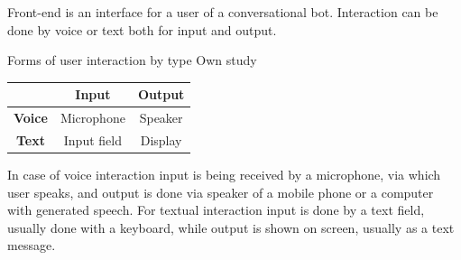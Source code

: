 Front-end is an interface for a user of a conversational bot.
Interaction can be done by voice or text both for input and output.

\mttable
{Forms of user interaction by type}
{Own study}
{
    \begin{tabular}{|c|c|c|}
        \hline
        & \textbf{Input} & \textbf{Output} \\
        \hline
        \textbf{Voice} & Microphone & Speaker \\
        \hline
        \textbf{Text} & Input field & Display \\
        \hline
    \end{tabular}
}

In case of voice interaction input is being received by a microphone, via which user speaks, and output is done via speaker of a mobile phone or a computer with generated speech.
For textual interaction input is done by a text field, usually done with a keyboard, while output is shown on screen, usually as a text message.

